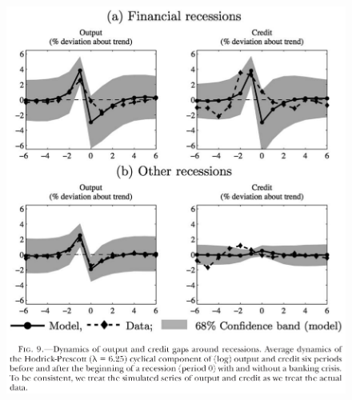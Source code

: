\documentclass{beamer}
\begin{document}
\begin{frame}
  \begin{figure}
    \includegraphics[scale=.7]{boissay3.eps}
  \end{figure}
\end{frame}

\end{document}

